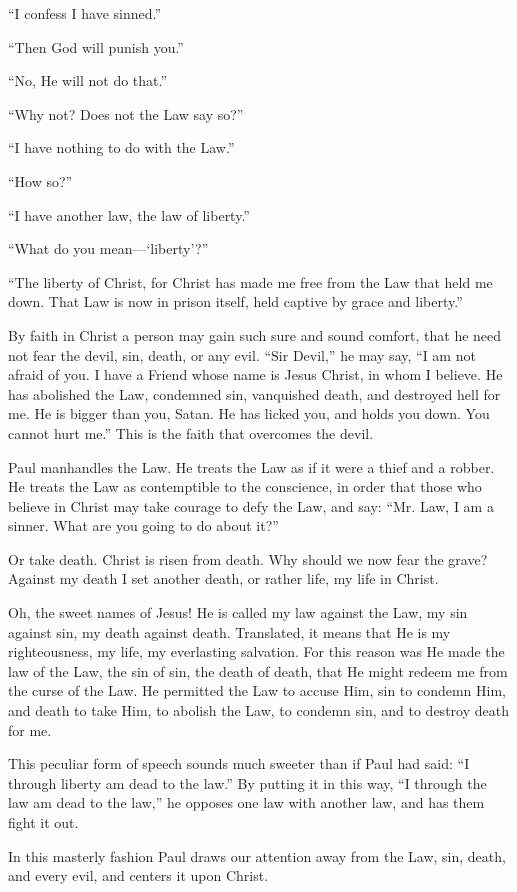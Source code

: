 “I confess I have sinned.”

“Then God will punish you.”

“No, He will not do that.”

“Why not? Does not the Law say so?”

“I have nothing to do with the Law.”

“How so?”

“I have another law, the law of liberty.”

“What do you mean—‘liberty’?”

“The liberty of Christ, for Christ has made me free from the Law that held me down. That Law is now in prison itself, held captive by grace and liberty.”

By faith in Christ a person may gain such sure and sound comfort, that he need not fear the devil, sin, death, or any evil. “Sir Devil,” he may say, “I am not afraid of you. I have a Friend whose name is Jesus Christ, in whom I believe. He has abolished the Law, condemned sin, vanquished death, and destroyed hell for me. He is bigger than you, Satan. He has licked you, and holds you down. You cannot hurt me.” This is the faith that overcomes the devil.

Paul manhandles the Law. He treats the Law as if it were a thief and a robber. He treats the Law as contemptible to the conscience, in order that those who believe in Christ may take courage to defy the Law, and say: “Mr. Law, I am a sinner. What are you going to do about it?”

Or take death. Christ is risen from death. Why should we now fear the grave? Against my death I set another death, or rather life, my life in Christ.

Oh, the sweet names of Jesus! He is called my law against the Law, my sin against sin, my death against death. Translated, it means that He is my righteousness, my life, my everlasting salvation. For this reason was He made the law of the Law, the sin of sin, the death of death, that He might redeem me from the curse of the Law. He permitted the Law to accuse Him, sin to condemn Him, and death to take Him, to abolish the Law, to condemn sin, and to destroy death for me.

This peculiar form of speech sounds much sweeter than if Paul had said: “I through liberty am dead to the law.” By putting it in this way, “I through the law am dead to the law,” he opposes one law with another law, and has them fight it out.

In this masterly fashion Paul draws our attention away from the Law, sin, death, and every evil, and centers it upon Christ.

